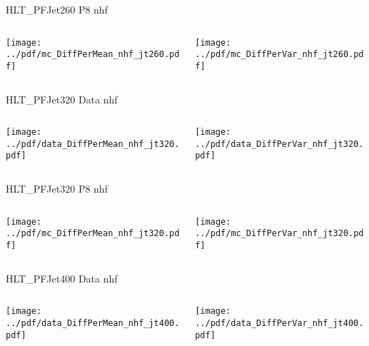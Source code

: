\documentclass[9pt]{beamer}
\begin{document}
\begin{frame}[t]{HLT\_PFJet260 P8 nhf}
\begin{columns}[T]
  \begin{column}{.5\textwidth}
  \texttt{[image: ../pdf/mc\_DiffPerMean\_nhf\_jt260.pdf]}
  \end{column}
  \begin{column}{.5\textwidth}
  \texttt{[image: ../pdf/mc\_DiffPerVar\_nhf\_jt260.pdf]}
  \end{column}
\end{columns}
\end{frame}

\begin{frame}[t]{HLT\_PFJet320 Data nhf}
\begin{columns}[T]
  \begin{column}{.5\textwidth}
  \texttt{[image: ../pdf/data\_DiffPerMean\_nhf\_jt320.pdf]}
  \end{column}
  \begin{column}{.5\textwidth}
  \texttt{[image: ../pdf/data\_DiffPerVar\_nhf\_jt320.pdf]}
  \end{column}
\end{columns}
\end{frame}

\begin{frame}[t]{HLT\_PFJet320 P8 nhf}
\begin{columns}[T]
  \begin{column}{.5\textwidth}
  \texttt{[image: ../pdf/mc\_DiffPerMean\_nhf\_jt320.pdf]}
  \end{column}
  \begin{column}{.5\textwidth}
  \texttt{[image: ../pdf/mc\_DiffPerVar\_nhf\_jt320.pdf]}
  \end{column}
\end{columns}
\end{frame}

\begin{frame}[t]{HLT\_PFJet400 Data nhf}
\begin{columns}[T]
  \begin{column}{.5\textwidth}
  \texttt{[image: ../pdf/data\_DiffPerMean\_nhf\_jt400.pdf]}
  \end{column}
  \begin{column}{.5\textwidth}
  \texttt{[image: ../pdf/data\_DiffPerVar\_nhf\_jt400.pdf]}
  \end{column}
\end{columns}
\end{frame}
\end{document}
